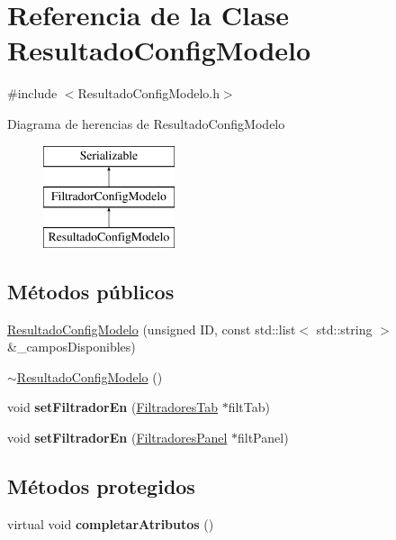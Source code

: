 \hypertarget{classResultadoConfigModelo}{\section{\-Referencia de la \-Clase \-Resultado\-Config\-Modelo}
\label{classResultadoConfigModelo}
}


{\ttfamily \#include $<$\-Resultado\-Config\-Modelo.\-h$>$}

\-Diagrama de herencias de \-Resultado\-Config\-Modelo\begin{figure}[H]
\begin{center}
\leavevmode
\includegraphics[height=3.000000cm]{classResultadoConfigModelo}
\end{center}
\end{figure}
\subsection*{\-Métodos públicos}
\begin{DoxyCompactItemize}
\item 
\hyperlink{classResultadoConfigModelo_aa93bc3a931e75774aeeeb9b50dd7ebd4}{\-Resultado\-Config\-Modelo} (unsigned \-I\-D, const std\-::list$<$ std\-::string $>$ \&\-\_\-campos\-Disponibles)
\item 
\hyperlink{classResultadoConfigModelo_a79ca021b8535f7c29730907077d12c8e}{$\sim$\-Resultado\-Config\-Modelo} ()
\item 
\hypertarget{classResultadoConfigModelo_a1ce6ac30cce01a3648efb5b356f497e5}{void {\bfseries set\-Filtrador\-En} (\hyperlink{classFiltradoresTab}{\-Filtradores\-Tab} $\ast$filt\-Tab)}\label{classResultadoConfigModelo_a1ce6ac30cce01a3648efb5b356f497e5}

\item 
\hypertarget{classResultadoConfigModelo_a4881f4ece305a0f490adbfd5541fe3f3}{void {\bfseries set\-Filtrador\-En} (\hyperlink{classFiltradoresPanel}{\-Filtradores\-Panel} $\ast$filt\-Panel)}\label{classResultadoConfigModelo_a4881f4ece305a0f490adbfd5541fe3f3}

\end{DoxyCompactItemize}
\subsection*{\-Métodos protegidos}
\begin{DoxyCompactItemize}
\item 
\hypertarget{classResultadoConfigModelo_a85b5525d15275c6e357e081c50df14ab}{virtual void {\bfseries completar\-Atributos} ()}\label{classResultadoConfigModelo_a85b5525d15275c6e357e081c50df14ab}

\end{DoxyCompactItemize}


